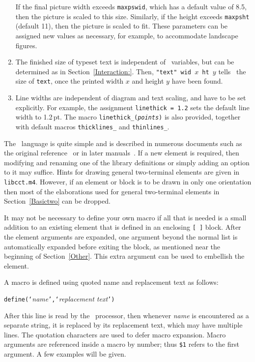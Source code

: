 \begin{enumerate}
  If the final picture width exceeds {\tt maxpswid}, which
  has a default value of 8.5, then the picture is scaled to this size.
  Similarly, if the height exceeds {\tt maxpsht} (default 11), then the
  picture is scaled to fit.  These parameters can be assigned
  new values as necessary, for example, to accommodate landscape figures.

\item The finished size of typeset text is independent of \pic\ variables,
  but can be determined as in Section~\ref{Interaction:}.  Then,
  {\tt "text" wid $x$ ht $y$} tells \pic\ the size of {\tt text},
  once the printed width $x$ and height $y$ have been found.

\item Line widths are independent of diagram and text scaling, and have
  to be set explicitly.  For example,
  the assignment {\tt linethick = 1.2} sets the default line width to 1.2\,pt.
  The macro {\tt linethick\_({\sl points})} is also provided, together
  with default macros {\tt thicklines\_} and {\tt thinlines\_}.

\end{enumerate}

\label{Writing:}
The \Mfour\ language is quite simple and is
described in numerous documents such as the original
reference~\cite{KRm4} or in later manuals~\cite{Seindal94}.  If a new
element is required, then modifying and renaming one of
the library definitions or simply adding an option to it may
suffice.  Hints for drawing general two-terminal elements are given in
{\tt libcct.m4}.  However, if an element or block is to be drawn in
only one orientation then most of the elaborations used for general
two-terminal elements in Section~\ref{Basictwo} can be dropped.

It may not be necessary to define your own macro if all that is needed is
a small addition to an existing element that is defined in an enclosing
\verb|[ ]| block.  After the element arguments are expanded,
one argument beyond the normal list is automatically expanded before
exiting the block, as mentioned near the beginning of Section~\ref{Other}.
This extra argument can be used to embellish the element.  

A macro is defined using quoted name and replacement text as follows:

{\tt define(`}{\sl name}{\tt',`}{\sl replacement text}{\tt ')}

After this line is read by the \Mfour\ processor, then whenever {\sl name}
is encountered as a separate string, it is replaced by its replacement
text, which may have multiple lines.  The quotation characters are used
to defer macro expansion.  Macro arguments are referenced inside a
macro by number; thus {\tt \$1} refers to the first argument.
A few examples will be given.

